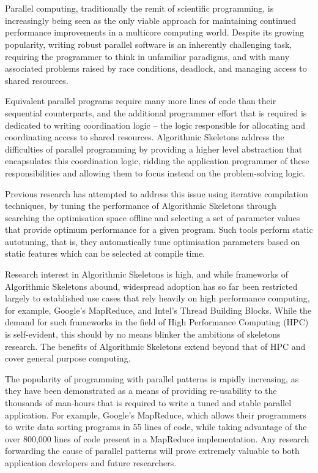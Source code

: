 ~\cite{Cole1989, Cole2004}

~\cite{Dean2008}
~\cite{IntelTBB}

Parallel computing, traditionally the remit of scientific programming,
is increasingly being seen as the only viable approach for maintaining
continued performance improvements in a multicore computing world.
Despite its growing popularity, writing robust parallel software is an
inherently challenging task, requiring the programmer to think in
unfamiliar paradigms, and with many associated problems raised by race
conditions, deadlock, and managing access to shared resources.

Equivalent parallel programs require many more lines of code than
their sequential counterparts, and the additional programmer effort
that is required is dedicated to writing coordination logic -- the
logic responsible for allocating and coordinating access to shared
resources. Algorithmic Skeletons address the difficulties of parallel
programming by providing a higher level abstraction that encapsulates
this coordination logic, ridding the application programmer of these
responsibilities and allowing them to focus instead on the
problem-solving logic.

Previous research has attempted to address this issue using iterative
compilation techniques, by tuning the performance of Algorithmic
Skeletons through searching the optimisation space offline and
selecting a set of parameter values that provide optimum performance
for a given program. Such tools perform static autotuning, that is,
they automatically tune optimisation parameters based on static
features which can be selected at compile time.

Research interest in Algorithmic Skeletons is high, and while
frameworks of Algorithmic Skeletons abound, widespread adoption has so
far been restricted largely to established use cases that rely heavily
on high performance computing, for example, Google's MapReduce, and
Intel's Thread Building Blocks. While the demand for such frameworks
in the field of High Performance Computing (HPC) is self-evident, this
should by no means blinker the ambitions of skeletons research. The
benefits of Algorithmic Skeletons extend beyond that of HPC and cover
general purpose computing.

The popularity of programming with parallel patterns is rapidly
increasing, as they have been demonstrated as a means of providing
re-usability to the thousands of man-hours that is required to write a
tuned and stable parallel application. For example, Google's
MapReduce, which allows their programmers to write data sorting
programs in 55 lines of code, while taking advantage of the over
800,000 lines of code present in a MapReduce implementation. Any
research forwarding the cause of parallel patterns will prove
extremely valuable to both application developers and future
researchers.

